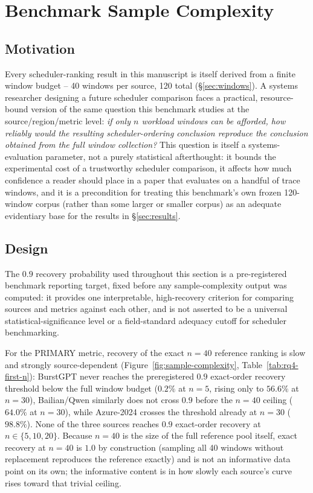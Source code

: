 \section{Benchmark Sample Complexity}
\label{sec:sample-complexity}

\subsection{Motivation}
\label{sec:sample-complexity-motivation}

Every scheduler-ranking result in this manuscript is itself derived from a
finite window budget -- 40 windows per source, 120 total
(\S\ref{sec:windows}). A systems researcher designing a future scheduler
comparison faces a practical, resource-bound version of the same question
this benchmark studies at the source/region/metric level: \emph{if only $n$
workload windows can be afforded, how reliably would the resulting
scheduler-ordering conclusion reproduce the conclusion obtained from the
full window collection?} This question is itself a systems-evaluation
parameter, not a purely statistical afterthought: it bounds the
experimental cost of a trustworthy scheduler comparison, it affects how
much confidence a reader should place in a paper that evaluates on a
handful of trace windows, and it is a precondition for treating this
benchmark's own frozen 120-window corpus (rather than some larger or
smaller corpus) as an adequate evidentiary base for the results in
\S\ref{sec:results}.

\subsection{Design}
\label{sec:sample-complexity-design}

The $0.9$ recovery probability used throughout this section is a
pre-registered benchmark reporting target, fixed before any
sample-complexity output was computed: it provides one interpretable,
high-recovery criterion for comparing sources and metrics against each
other, and is not asserted to be a universal statistical-significance
level or a field-standard adequacy cutoff for scheduler benchmarking.

For the PRIMARY metric, recovery of the exact $n=40$ reference ranking is
slow and strongly source-dependent (Figure~\ref{fig:sample-complexity},
Table~\ref{tab:rq4-first-n}): BurstGPT never reaches the preregistered
$0.9$ exact-order recovery threshold below the full window budget ($0.2\%$
at $n=5$, rising only to $56.6\%$ at $n=30$), Bailian/Qwen similarly does
not cross $0.9$ before the $n=40$ ceiling ($64.0\%$ at $n=30$), while Azure-2024
crosses the threshold already at $n=30$ ($98.8\%$). None of the three
sources reaches $0.9$ exact-order recovery at $n \in \{5,10,20\}$. Because
$n=40$ is the size of the full reference pool itself, exact recovery at
$n=40$ is $1.0$ by construction (sampling all 40 windows without
replacement reproduces the reference exactly) and is not an informative
data point on its own; the informative content is in how slowly each
source's curve rises toward that trivial ceiling.

